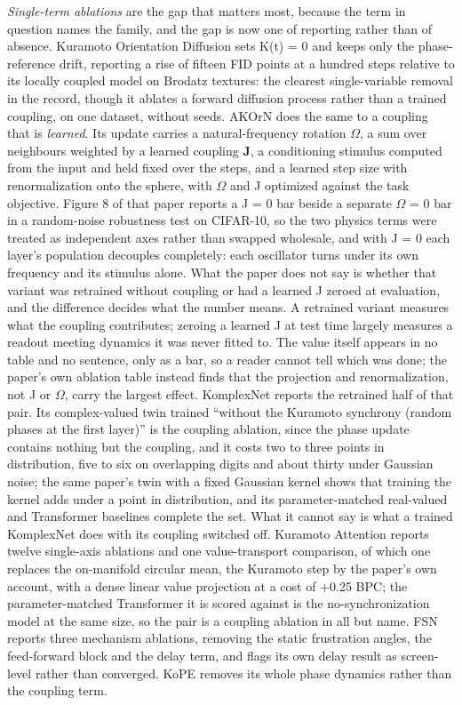 \documentclass[10pt]{article}
\begin{document}
\emph{Single-term ablations} are the gap that matters most, because the
term in question names the family, and the gap is now one of reporting
rather than of absence. Kuramoto Orientation Diffusion
\citep{kuramoto-orientation-diffusion} sets K(t) = 0 and keeps only the
phase-reference drift, reporting a rise of fifteen FID points at a
hundred steps relative to its locally coupled model on Brodatz textures:
the clearest single-variable removal in the record, though it ablates a
forward diffusion process rather than a trained coupling, on one
dataset, without seeds. AKOrN \citep{akorn} does the same to a coupling
that is \emph{learned}. Its update carries a natural-frequency rotation
\textbf{\ensuremath{\Omega}}, a sum over neighbours weighted by a
learned coupling \textbf{J}, a conditioning stimulus computed from the
input and held fixed over the steps, and a learned step size with
renormalization onto the sphere, with \ensuremath{\Omega} and J
optimized against the task objective. Figure 8 of that paper reports a J
= 0 bar beside a separate \ensuremath{\Omega} = 0 bar in a random-noise
robustness test on CIFAR-10, so the two physics terms were treated as
independent axes rather than swapped wholesale, and with J = 0 each
layer's population decouples completely: each oscillator turns under its
own frequency and its stimulus alone. What the paper does not say is
whether that variant was retrained without coupling or had a learned J
zeroed at evaluation, and the difference decides what the number means.
A retrained variant measures what the coupling contributes; zeroing a
learned J at test time largely measures a readout meeting dynamics it
was never fitted to. The value itself appears in no table and no
sentence, only as a bar, so a reader cannot tell which was done; the
paper's own ablation table instead finds that the projection and
renormalization, not J or \ensuremath{\Omega}, carry the largest effect.
KomplexNet \citep{muzellec2025} reports the retrained half of that pair.
Its complex-valued twin trained ``without the Kuramoto synchrony (random
phases at the first layer)'' is the coupling ablation, since the phase
update contains nothing but the coupling, and it costs two to three
points in distribution, five to six on overlapping digits and about
thirty under Gaussian noise; the same paper's twin with a fixed Gaussian
kernel shows that training the kernel adds under a point in
distribution, and its parameter-matched real-valued and Transformer
baselines complete the set. What it cannot say is what a trained
KomplexNet does with its coupling switched off. Kuramoto Attention
\citep{kuramoto-attention} reports twelve single-axis ablations and one
value-transport comparison, of which one replaces the on-manifold
circular mean, the Kuramoto step by the paper's own account, with a
dense linear value projection at a cost of +0.25 BPC; the
parameter-matched Transformer it is scored against is the
no-synchronization model at the same size, so the pair is a coupling
ablation in all but name. FSN \citep{nunley2026} reports three mechanism
ablations, removing the static frustration angles, the feed-forward
block and the delay term, and flags its own delay result as screen-level
rather than converged. KoPE \citep{kope} removes its whole phase
dynamics rather than the coupling term.
\end{document}
